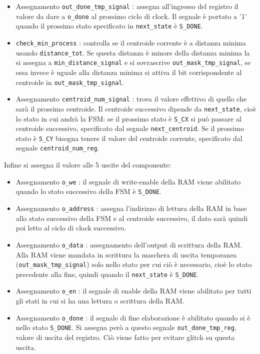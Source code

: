 \documentclass{article}
\begin{document}
\begin{itemize}
    \item Assegnamento \verb^out_done_tmp_signal^ : assegna all'ingresso del registro il valore da dare a \verb^o_done^ al prossimo ciclo di clock. Il segnale è portato a '1' quando il prossimo stato specificato in \verb^next_state^ è \verb^S_DONE^.
    \item \verb^check_min_process^ : controlla se il centroide corrente è a distanza minima usando \verb^distance_tot^. Se questa distanza è minore della distanza minima la si assegna a \verb^min_distance_signal^ e si sovrascrive \verb^out_mask_tmp_signal^, se essa invece è uguale alla distanza minima si attiva il bit corrispondente al centroide in \verb^out_mask_tmp_signal^.
    \item Assegnamento \verb^centroid_num_signal^ : trova il valore effettivo di quello che sarà il prossimo centroide. Il centroide successivo dipende da \verb^next_state^, cioè lo stato in cui andrà la FSM: se il prossimo stato è \verb^S_CX^ si può passare al centroide successivo, specificato dal segnale \verb^next_centroid^. Se il prossimo stato è \verb^S_CY^ bisogna tenere il valore del centroide corrente, specificato dal segnale \verb^centroid_num_reg^.
\end{itemize}
Infine si assegna il valore alle 5 uscite del componente:
\begin{itemize}
    \item Assegnamento \verb^o_we^ : il segnale di write-enable della RAM viene abilitato quando lo stato successivo della FSM è \verb^S_DONE^.
    \item Assegnamento \verb^o_address^ : assegna l'indirizzo di lettura della RAM in base allo stato successivo della FSM e al centroide successivo, il dato sarà quindi poi letto al ciclo di clock successivo.
    \item Assegnamento \verb^o_data^ : assegnamento dell'output di scrittura della RAM. Alla RAM viene mandata in scrittura la maschera di uscita temporanea (\verb^out_mask_tmp_signal^) solo nello stato per cui ciò è necessario, cioè lo stato precedente alla fine, quindi quando il \verb^next_state^ è \verb^S_DONE^.
    \item Assegnamento \verb^o_en^ : il segnale di enable della RAM viene abilitato per tutti gli stati in cui si ha una lettura o scrittura della RAM.
    \item Assegnamento \verb^o_done^ : il segnale di fine elaborazione è abilitato quando si è nello stato \verb^S_DONE^. Si assegna però a questo segnale \verb^out_done_tmp_reg^, valore di uscita del registro. Ciò viene fatto per evitare glitch su questa uscita.
\end{itemize}
\end{document}
